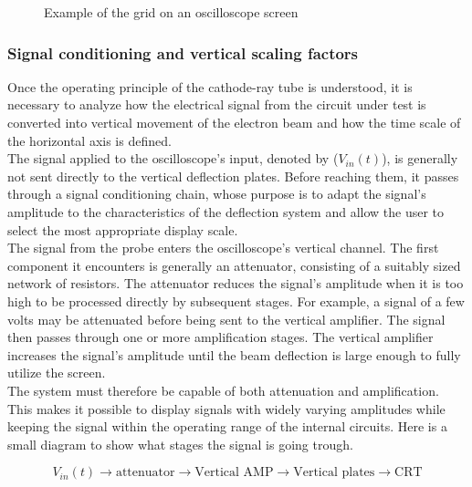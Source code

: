 \documentclass[../main.tex]{subfiles}
\begin{document}
\begin{figure}
\begin{center}
\end{center}
\caption{Example of the grid on an oscilloscope screen}	
\label{AanalogOScreen}
\end{figure}


\subsubsection{Signal conditioning and vertical scaling factors}


Once the operating principle of the cathode-ray tube is understood, it is necessary to analyze how the electrical signal from the circuit under test is converted into vertical movement of the electron beam and how the time scale of the horizontal axis is defined.\\

The signal applied to the oscilloscope’s input, denoted by ($V_{in}(t)$), is generally not sent directly to the vertical deflection plates. Before reaching them, it passes through a signal conditioning chain, whose purpose is to adapt the signal’s amplitude to the characteristics of the deflection system and allow the user to select the most appropriate display scale.\\


The signal from the probe enters the oscilloscope’s vertical channel. The first component it encounters is generally an attenuator, consisting of a suitably sized network of resistors. The attenuator reduces the signal’s amplitude when it is too high to be processed directly by subsequent stages. For example, a signal of a few volts may be attenuated before being sent to the vertical amplifier. The signal then passes through one or more amplification stages. The vertical amplifier increases the signal’s amplitude until the beam deflection is large enough to fully utilize the screen.\\


The system must therefore be capable of both attenuation and amplification. This makes it possible to display signals with widely varying amplitudes while keeping the signal within the operating range of the internal circuits. Here is a small diagram to show what stages the signal is going trough.


\begin{equation*}
	V_{in}(t)
\longrightarrow
\text{attenuator}
\longrightarrow
\text{Vertical AMP}
\longrightarrow
\text{Vertical plates}
\longrightarrow
\text{CRT}
\end{equation*}
\end{document}
